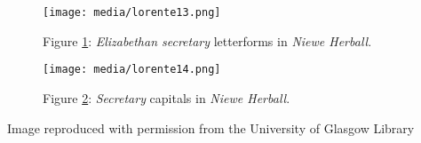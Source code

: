 \documentclass{article}
\begin{document}
\begin{figure}[H]
    \centering
    \texttt{[image: media/lorente13.png]}
    \caption{Figure \ref{fig:lorente13}: \emph{Elizabethan secretary} letterforms in \emph{Niewe
Herball}.\protect\footnotemark}
    \label{fig:lorente13}
\end{figure}

\begin{figure}[H]
    \centering
    \texttt{[image: media/lorente14.png]}
    \caption{Figure \ref{fig:lorente14}: \emph{Secretary} capitals in \emph{Niewe Herball}.}
    \label{fig:lorente14}
\end{figure}


 Image reproduced with permission from the University of Glasgow Library 


 
\end{document}
